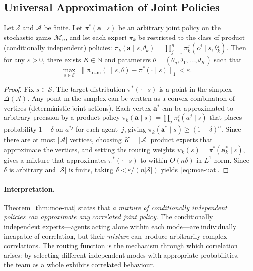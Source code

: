 \subsection{Universal Approximation of Joint Policies}
\label{subsec:universal-approx}

\begin{theorem}\label{thm:moe-uat}
Let $\mathcal{S}$ and $\bm{\mathcal{A}}$ be finite. Let $\pi^*(\bm{a}\mid s)$ be an arbitrary joint policy on the stochastic game~$\mathcal{M}_n$, and let each expert $\pi_k$ be restricted to the class of product (conditionally independent) policies: $\pi_k(\bm{a}\mid s,\theta_k)=\prod_{j=1}^n\pi_k^j(a^j\mid s,\theta_k^j)$. Then for any $\varepsilon>0$, there exists $K\in\mathbb{N}$ and parameters $\theta=(\theta_g,\theta_1,\ldots,\theta_K)$ such that
\begin{equation}\label{eq:moe-uat}
  \max_{s\in\mathcal{S}}\;\bigl\|\pi_{\mathrm{team}}(\cdot\mid s,\theta)-\pi^*(\cdot\mid s)\bigr\|_1 < \varepsilon.
\end{equation}
\end{theorem}

\begin{proof}
Fix $s\in\mathcal{S}$. The target distribution $\pi^*(\cdot\mid s)$ is a point in the simplex $\Delta(\bm{\mathcal{A}})$. Any point in the simplex can be written as a convex combination of vertices (deterministic joint actions). Each vertex $\bm{a}^*$ can be approximated to arbitrary precision by a product policy $\pi_k(\bm{a}\mid s)=\prod_j\pi_k^j(a^j\mid s)$ that places probability $1-\delta$ on $a^{*j}$ for each agent~$j$, giving $\pi_k(\bm{a}^*\mid s)\ge(1-\delta)^n$. Since there are at most $|\bm{\mathcal{A}}|$ vertices, choosing $K=|\bm{\mathcal{A}}|$ product experts that approximate the vertices, and setting the routing weights $w_k(s)=\pi^*(\bm{a}_k^*\mid s)$, gives a mixture that approximates $\pi^*(\cdot\mid s)$ to within $O(n\delta)$ in $L^1$ norm. Since $\delta$ is arbitrary and $|\mathcal{S}|$ is finite, taking $\delta<\varepsilon/(n|\mathcal{S}|)$ yields~\eqref{eq:moe-uat}.
\end{proof}

\paragraph{Interpretation.} Theorem~\ref{thm:moe-uat} states that \emph{a mixture of conditionally independent policies can approximate any correlated joint policy}. The conditionally independent experts---agents acting alone within each mode---are individually incapable of correlation, but their \emph{mixture} can produce arbitrarily complex correlations. The routing function is the mechanism through which correlation arises: by selecting different independent modes with appropriate probabilities, the team as a whole exhibits correlated behaviour.

